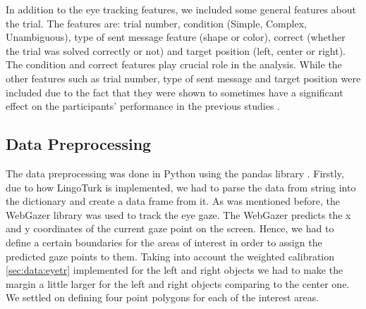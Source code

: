 In addition to the eye tracking features, we included some general features about the trial. The features are: trial number, condition (Simple, Complex, Unambiguous), type of sent message feature (shape or color), correct (whether the trial was solved correctly or not) and target position (left, center or right). The condition and correct features play crucial role in the analysis. While the other features such as trial number, type of sent message and target position were included due to the fact that they were shown to sometimes have a significant effect on the participants' performance in the previous studies \cite{Mayn_2023, Mayn_2025}.

\subsection{Data Preprocessing}
\label{sec:analysis:preprocessing}
The data preprocessing was done in Python using the pandas library \cite{pandas}. Firstly, due to how LingoTurk \cite{lingoturk} is implemented, we had to parse the data from string into the dictionary and create a data frame from it. As was mentioned before, the WebGazer \cite{webgazer} library was used to track the eye gaze. The WebGazer predicts the x and y coordinates of the current gaze point on the screen. Hence, we had to define a certain boundaries for the areas of interest in order to assign the predicted gaze points to them. Taking into account the weighted calibration \autoref{sec:data:eyetr} implemented for the left and right objects we had to make the margin a little larger for the left and right objects comparing to the center one. We settled on defining four point polygons for each of the interest areas. 

